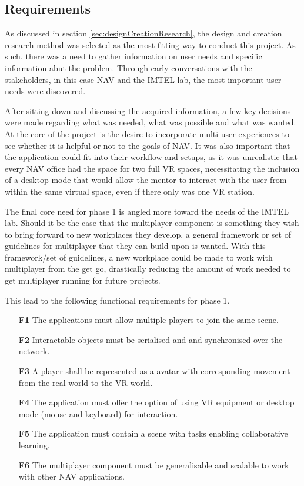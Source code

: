 \subsection{Requirements}

As discussed in section \ref{sec:designCreationResearch}, the design and creation research method was selected as the most fitting way to conduct this project. As such, there was a need to gather information on user needs and specific information abut the problem. Through early conversations with the stakeholders, in this case NAV and the IMTEL lab, the most important user needs were discovered. 

After sitting down and discussing the acquired information, a few key decisions were made regarding what was needed, what was possible and what was wanted.  At the core of the project is the desire to incorporate multi-user experiences to see whether it is helpful or not to the goals of NAV. It was also important that the application could fit into their workflow and setups, as it was unrealistic that every NAV office had the space for two full VR spaces, necessitating the inclusion of a desktop mode that would allow the mentor to interact with the user from within the same virtual space, even if there only was one VR station. 

The final core need for phase 1 is angled more toward the needs of the IMTEL lab. Should it be the case that the multiplayer component is something they wish to bring forward to new workplaces they develop, a general framework or set of guidelines for multiplayer that they can build upon is wanted. With this framework/set of guidelines, a new workplace could be made to work with multiplayer from the get go, drastically reducing the amount of work needed to get multiplayer running for future projects.

This lead to the following functional requirements for phase 1. 

\begin{enumerate}
  \setlength\itemsep{0em}
  \item [\textbf{F1}] The applications must allow multiple players to join the same scene.
  \item [\textbf{F2}] Interactable objects must be serialised and and synchronised over the network.
  \item [\textbf{F3}] A player shall be represented as a avatar with corresponding movement from the real world to the VR world.
  \item [\textbf{F4}] The application must offer the option of using VR equipment or desktop mode (mouse and keyboard) for interaction.
  \item [\textbf{F5}] The application must contain a scene with tasks enabling collaborative learning.
  \item [\textbf{F6}] The multiplayer component must be generalisable and scalable to work with other NAV applications.
\end{enumerate}

